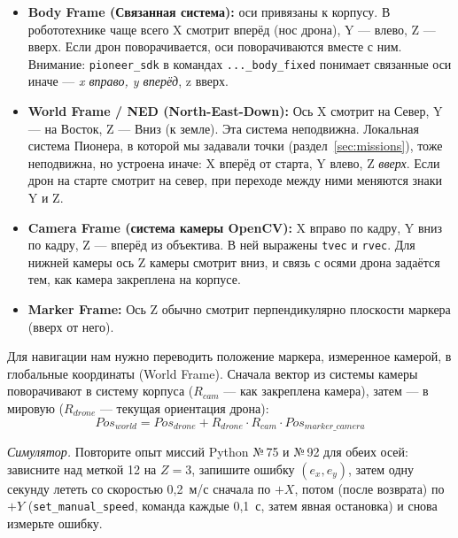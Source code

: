 \begin{itemize}
    \item \textbf{Body Frame (Связанная система):} оси привязаны к корпусу. В робототехнике чаще всего X смотрит вперёд (нос дрона), Y — влево, Z — вверх. Если дрон поворачивается, оси поворачиваются вместе с ним. Внимание: \verb|pioneer_sdk| в командах \verb|..._body_fixed| понимает связанные оси иначе --- \emph{x вправо, y вперёд}, z вверх.
    \item \textbf{World Frame / NED (North-East-Down):} Ось X смотрит на Север, Y — на Восток, Z — Вниз (к земле). Эта система неподвижна. Локальная система Пионера, в которой мы задавали точки (раздел~\ref{sec:missions}), тоже неподвижна, но устроена иначе: X вперёд от старта, Y влево, Z \emph{вверх}. Если дрон на старте смотрит на север, при переходе между ними меняются знаки Y и Z.
    \item \textbf{Camera Frame (система камеры OpenCV):} X вправо по кадру, Y вниз по кадру, Z --- вперёд из объектива. В ней выражены \texttt{tvec} и \texttt{rvec}. Для нижней камеры ось Z камеры смотрит вниз, и связь с осями дрона задаётся тем, как камера закреплена на корпусе.
    \item \textbf{Marker Frame:} Ось Z обычно смотрит перпендикулярно плоскости маркера (вверх от него).
\end{itemize}

Для навигации нам нужно переводить положение маркера, измеренное камерой, в глобальные координаты (World Frame). Сначала вектор из системы камеры поворачивают в систему корпуса ($R_{cam}$ --- как закреплена камера), затем --- в мировую ($R_{drone}$ --- текущая ориентация дрона):
$$ Pos_{world} = Pos_{drone} + R_{drone} \cdot R_{cam} \cdot Pos_{marker\_camera} $$

\begin{taskbox}
\emph{Симулятор.} Повторите опыт миссий Python №\,75 и №\,92 для обеих осей: зависните над меткой 12 на $Z = 3$, запишите ошибку $(e_x, e_y)$, затем одну секунду лететь со скоростью 0,2~м/с сначала по $+X$, потом (после возврата) по $+Y$ (\verb|set_manual_speed|, команда каждые 0,1~с, затем явная остановка) и снова измерьте ошибку.
\end{taskbox}

